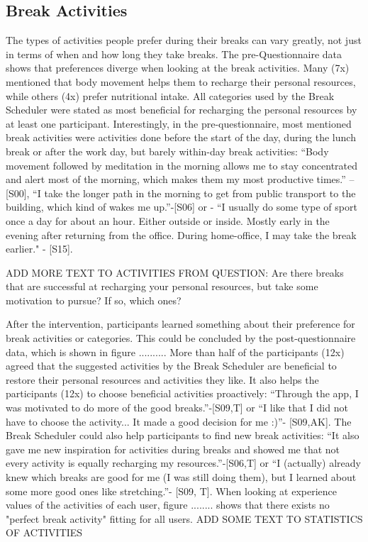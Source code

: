 \documentclass{hasel_thesis}
\begin{document}
\subsection{Break Activities} \label{activities_difference}
The types of activities people prefer during their breaks can vary greatly, not just in terms of when and how long they take breaks. The pre-Questionnaire data shows that preferences diverge when looking at the break activities. Many (7x) mentioned that body movement helps them to recharge their personal resources, while others (4x) prefer nutritional intake. All categories used by the Break Scheduler were stated as most beneficial for recharging the personal resources by at least one participant. Interestingly, in the pre-questionnaire, most mentioned break activities were activities done before the start of the day, during the lunch break or after the work day, but barely within-day break activities: “Body movement followed by meditation in the morning allows me to stay concentrated and alert most of the morning, which makes them my most productive times.” –[S00],  “I take the longer path in the morning to get from public transport to the building, which kind of wakes me up.”-[S06] or -	“I usually do some type of sport once a day for about an hour. Either outside or inside. Mostly early in the evening after returning from the office. During home-office, I may take the break earlier." - [S15]. 

ADD MORE TEXT TO ACTIVITIES FROM QUESTION: Are there breaks that are successful at recharging your personal resources, but take some motivation to pursue? If so, which ones?

After the intervention, participants learned something about their preference for break activities or categories. This could be concluded by the post-questionnaire data, which is shown in figure .......... More than half of the participants (12x) agreed that the suggested activities by the Break Scheduler are beneficial to restore their personal resources and activities they like. It also helps the participants (12x) to choose beneficial activities proactively: “Through the app, I was motivated to do more of the good breaks.”-[S09,T] or “I like that I did not have to choose the activity... It made a good decision for me :)”- [S09,AK]. The Break Scheduler could also help participants to find new break activities: “It also gave me new inspiration for activities during breaks and showed me that not every activity is equally recharging my resources.”-[S06,T] or “I (actually) already knew which breaks are good for me (I was still doing them), but I learned about some more good ones like stretching.”- [S09, T]. When looking at experience values of the activities of each user, figure ........ shows that there exists no "perfect break activity" fitting for all users. ADD SOME TEXT TO STATISTICS OF ACTIVITIES
\end{document}
